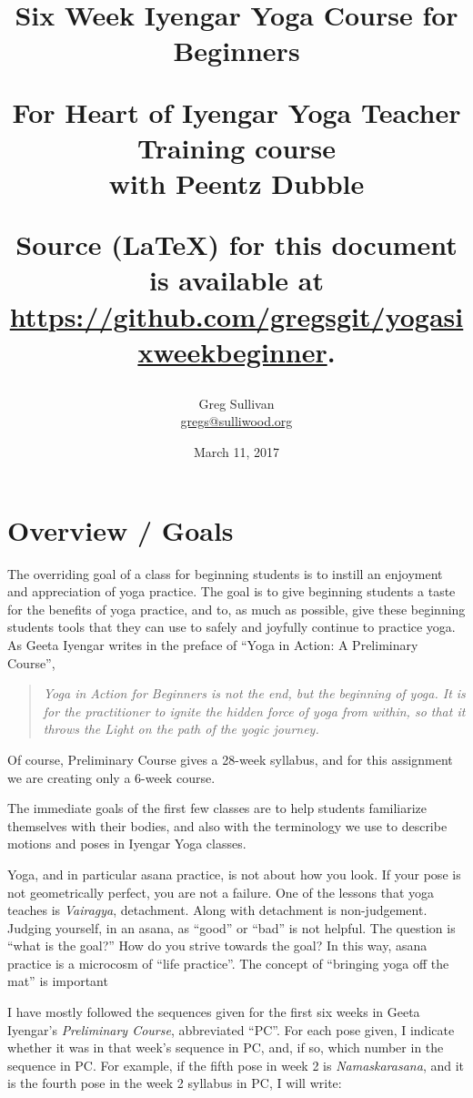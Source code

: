 \documentclass[letter, oneside]{book}
\title{Six Week Iyengar Yoga Course for Beginners\\
  \begin{minipage}{1.0\linewidth}
    \vspace{1.0in}
    {\large For Heart of Iyengar Yoga Teacher Training course \\
      with Peentz Dubble}
  \end{minipage}
  \begin{minipage}{1.0\linewidth}
    \vspace{1.0in}
    {\small Source (LaTeX) for this document is available at\\
      \url{https://github.com/gregsgit/yogasixweekbeginner}.}
  \end{minipage}
}
\author{Greg Sullivan \\
  \href{mailto:gregs@sulliwood.org}{gregs@sulliwood.org}}
\date{March 11, 2017}
\newcommand{\apose}[1]{\emph{#1}}
\newcommand{\nam}{\apose{Namaskarasana}}
\newcounter{week}
\newcounter{pose}
\begin{document}

\maketitle

\tableofcontents

\chapter*{Overview / Goals}
\label{chap:overview}


The overriding goal of a class for beginning students is to instill an
enjoyment and appreciation of yoga practice. The goal is to give
beginning students a taste for the benefits of yoga practice, and to,
as much as possible, give these beginning students tools that they can
use to safely and joyfully continue to practice yoga. As Geeta Iyengar
writes in the preface of ``Yoga in Action: A Preliminary
Course''\cite{GeetaPC}, 

\begin{quote}
  \emph{Yoga in Action for Beginners is not the end, but the beginning of
  yoga. It is for the practitioner to ignite the hidden force of yoga
  from within, so that it throws the Light on the path of the yogic
  journey.}
\end{quote}

Of course, Preliminary Course gives a 28-week syllabus, and for this
assignment we are creating only a 6-week course.

The immediate goals of the first few classes are to help students
familiarize themselves with their bodies, and also with the
terminology we use to describe motions and poses in Iyengar Yoga
classes.

Yoga, and in particular asana practice, is not about how you look. If
your pose is not geometrically perfect, you are not a failure. One of
the lessons that yoga teaches is \emph{Vairagya}, detachment. Along
with detachment is non-judgement. Judging yourself, in an asana, as
``good'' or ``bad'' is not helpful. The question is ``what is the
goal?'' How do you strive towards the goal? In this way, asana
practice is a microcosm of ``life practice''. The concept of
``bringing yoga off the mat'' is important

I have mostly followed the sequences given for the first six weeks in
Geeta Iyengar's \emph{Preliminary Course}\cite{GeetaPC}, abbreviated
``PC''. For each pose given, I indicate whether it was in that week's
sequence in PC, and, if so, which number in the sequence in PC.
For example, if the fifth pose in week 2 is \nam{}, and it is 
the fourth pose in the week 2 syllabus in PC, I will write:
\end{document}
